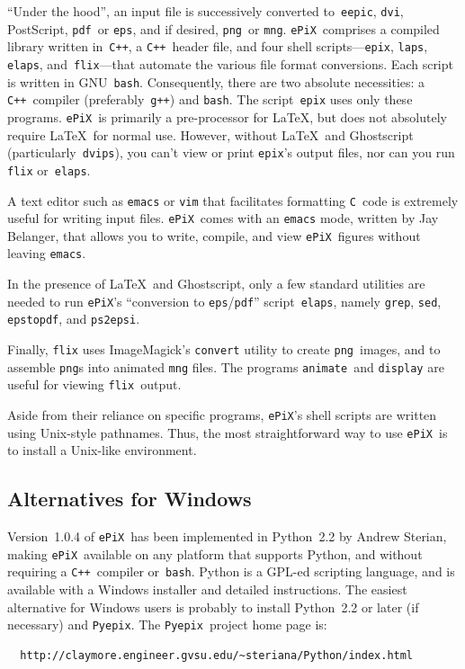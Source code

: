 \documentclass[12pt]{report}
\newcommand{\code}[1]{\texttt{#1}}
\newcommand{\ePiX}{\code{ePiX}}
\newcommand{\epix}{\code{epix}}
\newcommand{\C}{\code{C}}
\newcommand{\CXX}{\code{C++}}
\newcommand{\pyepix}{\code{Pyepix}}
\begin{document}
``Under the hood'', an input file is successively converted
to~\code{eepic}, \code{dvi}, PostScript, \code{pdf}~or \code{eps}, and
if desired, \code{png}~or \code{mng}.  \ePiX\ comprises a compiled
library written in~\CXX, a \CXX\ header file, and four shell
scripts---\epix, \code{laps}, \code{elaps}, and~\code{flix}---that
automate the various file format conversions.  Each script is written
in GNU~\code{bash}.  Consequently, there are two absolute necessities:
a \CXX\ compiler (preferably~\code{g++}) and \code{bash}. The
script~\code{epix} uses only these programs.  \ePiX\ is primarily a
pre-processor for \LaTeX, but does not absolutely require \LaTeX\ for
normal use. However, without \LaTeX~and Ghostscript
(particularly~\code{dvips}), you can't view or print \code{epix}'s
output files, nor can you run \code{flix} or~\code{elaps}.

A text editor such as \code{emacs} or \code{vim} that facilitates
formatting \C~code is extremely useful for writing input files. \ePiX\
comes with an \code{emacs} mode, written by Jay Belanger, that allows
you to write, compile, and view \ePiX\ figures without leaving
\code{emacs}.


In the presence of \LaTeX~and Ghostscript, only a few standard
utilities are needed to run \ePiX's ``conversion to
\code{eps}/\code{pdf}'' script~\code{elaps}, namely \code{grep},
\code{sed}, \code{epstopdf}, and \code{ps2epsi}.

Finally, \code{flix} uses ImageMagick's \code{convert} utility to
create \code{png}~images, and to assemble \code{png}s into animated
\code{mng} files. The programs \code{animate}~and \code{display} are
useful for viewing \code{flix}~output.\index{Animation}

Aside from their reliance on specific programs, \ePiX's shell scripts
are written using Unix-style pathnames. Thus, the most straightforward
way to use \ePiX\ is to install a Unix-like environment.


\subsection*{Alternatives for Windows}

Version~1.0.4 of \ePiX\ has been implemented in Python~2.2 by Andrew
Sterian, making \ePiX\ available on any platform that supports Python,
and without requiring a \CXX~compiler or~\code{bash}.  Python is a
GPL-ed scripting language, and is available with a Windows installer
and detailed instructions.  The easiest alternative for Windows users
is probably to install Python~2.2 or later (if necessary) and
\code{Pyepix}. The \pyepix\ project home page is:
\begin{verbatim}
  http://claymore.engineer.gvsu.edu/~steriana/Python/index.html
\end{verbatim}
\end{document}

